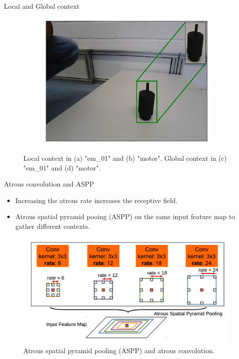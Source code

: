 \documentclass{beamer}
\begin{document}
\begin{frame}{Local and Global context}
\begin{figure}[h]
		\begin{subfigure}{.45\textwidth}
			\centering
			\includegraphics[width=.4\linewidth]{images/motor_context_g}
			\caption{}
			\label{Fig:motorg}
		\end{subfigure}
		\captionsetup{justification=centering,margin=0.2cm}
		\caption{Local context in (a) "em\_01" and (b) "motor". Global context in (c) "em\_01" and (d) "motor".}
		\label{Fig:context}
	\end{figure}

\end{frame}

\begin{frame}{Atrous convolution and ASPP}

	\begin{small}
		\begin{itemize}
			\item Increasing the atrous rate increases the receptive field.
			\item Atrous spatial pyramid pooing (ASPP) on the same input feature map to gather different contexts.
		\end{itemize}
	\end{small}
	
	\begin{figure}
		\centering
		\includegraphics[width=0.5\linewidth]{images/aspp}
		\captionsetup{justification=centering,margin=0.2cm}
		\caption{Atrous spatial pyramid pooling (ASPP) and atrous convolution.}
		\label{Fig:deepLabv4}
	\end{figure}

\end{frame}
\end{document}
